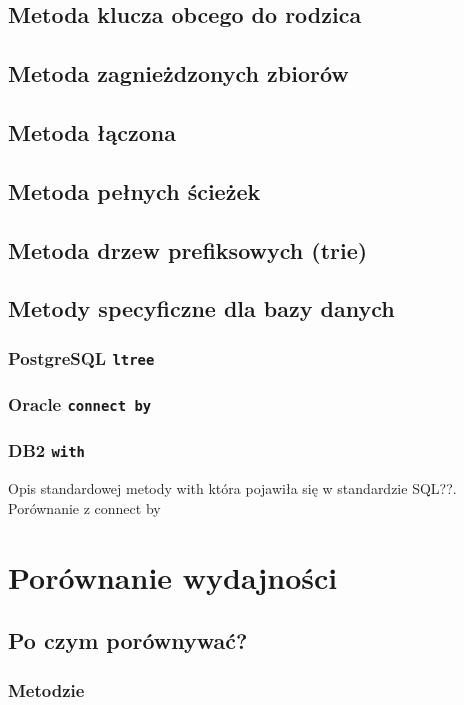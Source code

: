 \documentclass[10pt,a4paper,oneside]{book}
\begin{document}
\section{Metoda klucza obcego do rodzica}

\section{Metoda zagnieżdzonych zbiorów}

\section{Metoda łączona}

\section{Metoda pełnych ścieżek}

\section{Metoda drzew prefiksowych (trie)}

\section{Metody specyficzne dla bazy danych}
\subsection{PostgreSQL \texttt{ltree}}
\subsection{Oracle \texttt{connect by}}
\subsection{DB2 \texttt{with}}
Opis standardowej metody with która pojawiła się w standardzie SQL??. Porównanie z connect by

\chapter{Porównanie wydajności}
\section{Po czym porównywać?}
\subsection{Metodzie}
\end{document}
